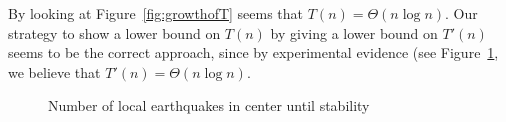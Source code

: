 \documentclass[runningheads,a4paper]{llncs}
\begin{document}
By looking at Figure~\ref{fig:growthofT} seems that $T(n) = \Theta(n\log n)$. Our strategy to show a lower bound on $T(n)$ by giving a lower bound on $T'(n)$ seems to be the correct approach, since by experimental evidence (see Figure~\ref{fig:growthofT'}, we believe that $T'(n) = \Theta(n\log n)$.

\begin{figure}[!ht]
\centering
{} \qquad
{}
\caption{Number of local earthquakes in center until stability}
\label{fig:growthofT'}
\end{figure}
\end{document}
